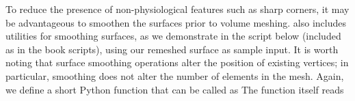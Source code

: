 To reduce the presence of non-physiological features such as sharp
corners, it may be advantageous to smoothen the surfaces prior to
volume meshing. \svmtk{} also includes utilities for smoothing surfaces, as
we demonstrate in the script below (included as
 in the book scripts), using
our remeshed surface  as sample input. It is worth 
noting that surface smoothing operations alter the position of existing 
vertices; in particular, smoothing does not alter the number of elements in 
the mesh. 
%
%
Again, we define a short Python function
 that can be called as
\noindent The function itself reads

